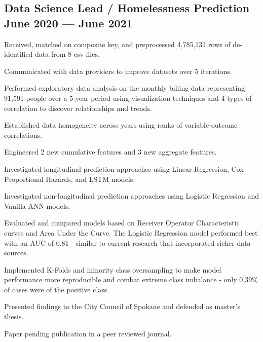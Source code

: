 \documentclass[letter,10pt]{article}
\begin{document}
\subsection{{Data Science Lead / Homelessness Prediction \hfill June 2020 --- June 2021}}
\begin{zitemize}
    \item Received, matched on composite key, and preprocessed 4,785,131 rows of de-identified data from 8 csv files.
    \item Communicated with data providers to improve datasets over 5 iterations.
    \item Performed exploratory data analysis on the monthly billing data representing 91,591 people over a 5-year period using visualization techniques and 4 types of correlation to discover relationships and trends.
    \item Established data homogeneity across years using ranks of variable-outcome correlations.
    \item Engineered 2 new cumulative features and 3 new aggregate features.
    \item Investigated longitudinal prediction approaches using Linear Regression, Cox Proportional Hazards, and LSTM models.
    \item Investigated non-longitudinal prediction approaches using Logistic Regression and Vanilla ANN models.
    \item Evaluated and compared models based on Receiver Operator Characteristic curves and Area Under the Curve. The Logistic Regression model performed best with an AUC of 0.81 - similar to current research that incorporated richer data sources.
    \item Implemented K-Folds and minority class oversampling to make model performance more reproducible and combat extreme class imbalance - only 0.39\% of cases were of the positive class.
    \item Presented findings to the City Council of Spokane and defended as master's thesis.
    \item Paper pending publication in a peer reviewed journal.
\end{zitemize}

\newpage
\end{document}
